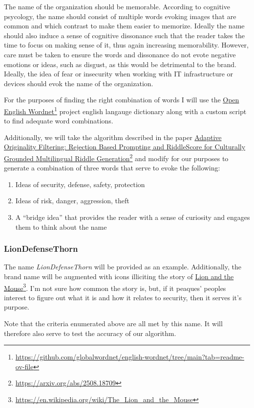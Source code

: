 

The name of the organization should be memorable.  According to cognitive 
psycology, the name should consist of multiple words evoking images that 
are common and which contrast to make them easier to memorize.  Ideally 
the name should also induce a sense of cognitive dissonance such that the
reader takes the time to focus on making sense of it, thus again increasing
memorability.  However, care must be taken to ensure the words and dissonance
do not evote negative emotions or ideas, such as disgust, as this would
be detrimental to the brand.  Ideally, the idea of fear or insecurity when
working with IT infrastructure or devices should evok the name of the 
organization.

For the purposes of finding the right combination of words I will use the
\href{https://github.com/globalwordnet/english-wordnet/tree/main?tab=readme-ov-file}
{Open English Wordnet}\footnote{\url{https://github.com/globalwordnet/english-wordnet/tree/main?tab=readme-ov-file}}
project english langauge dictionary along with a custom script to find adequate 
word combinations.

Additionally, we will take the algorithm described in the paper
\href{https://arxiv.org/abs/2508.18709}
{Adaptive Originality Filtering: Rejection Based Prompting and RiddleScore for Culturally Grounded Multilingual Riddle Generation}\footnote{\url{https://arxiv.org/abs/2508.18709}}
and modify for our purposes to generate a combination of three words that
serve to evoke the following:

\begin{enumerate}
    \item Ideas of security, defense, safety, protection
    \item Ideas of risk, danger, aggression, theft
    \item A ``bridge idea'' that provides the reader with a sense of curiosity and engages them to think about the name
\end{enumerate}

\subsubsection{LionDefenseThorn}

The name \emph{LionDefenseThorn} will be provided as an example.  Additionally, 
the brand name will be augmented with icons illiciting the story of 
\href{https://en.wikipedia.org/wiki/The_Lion_and_the_Mouse
}{Lion and the Mouse}\footnote{\url{https://en.wikipedia.org/wiki/The_Lion_and_the_Mouse}}.
I'm not sure how common the story is, but, if it peaques' peoples interest to
figure out what it is and how it relates to security, then it serves it's purpose.

Note that the criteria enumerated above are all met by this name.  It will 
therefore also serve to test the accuracy of our algorithm. 

